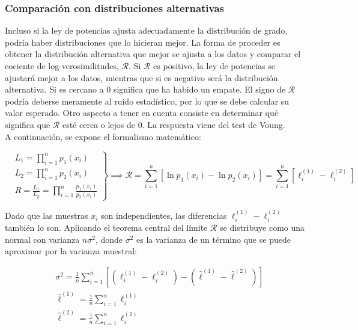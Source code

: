 \documentclass[12pt,a4paper]{report}
\begin{document}
	\subsubsection{Comparación con distribuciones alternativas}
	Incluso si la ley de potencias ajusta adecuadamente la distribución de grado, podría haber distribuciones que lo hicieran mejor. La forma de proceder es obtener la distribución alternativa que mejor se ajusta a los datos y comparar el cociente de log-verosimilitudes, $\mathcal{R}$. Si $\mathcal{R}$ es positivo, la ley de potencias se ajustará mejor a los datos, mientras que si es negativo será la distribución alternativa. Si es cercano a 0 significa que ha habido un empate. El signo de $\mathcal{R}$ podría deberse meramente al ruido estadístico, por lo que se debe calcular su valor esperado. Otro aspecto a tener en cuenta consiste en determinar qué significa que $\mathcal{R}$ esté cerca o lejos de 0. La respuesta viene del test de Voung. \\
	
	A continuación, se expone el formalismo matemático:
	
	\begin{equation}
	\left.
	\begin{aligned}
	& L_1 = \prod_{i=1}^n p_1(x_i) \\
	& L_2 = \prod_{i=1}^n p_2(x_i) \\
	& R = \frac{L_1}{L_2} = \prod_{i=1}^n \frac{p_1(x_i)}{p_2(x_i)}
	\end{aligned}
	\right\} \implies \mathcal{R} = \sum_{i=1}^n \left[\ln p_1(x_i) - \ln p_2(x_i)\right] = \sum_{i=1}^{n}\left[\ell_i^{(1)} - \ell_i^{(2)}\right]
	\end{equation}
	
	Dado que las muestras $x_i$ son independientes, las diferencias $\ell_i^{(1)} - \ell_i^{(2)}$ también lo son. Aplicando el teorema central del límite $\mathcal{R}$ se distribuye como una normal con varianza $n \sigma^2$, donde $\sigma^2$ es la varianza de un término que se puede aproximar por la varianza muestral:
	
	\begin{align}
	& \sigma^2 = \frac{1}{n}\sum_{i=1}^n\left[\left(\ell_i^{(1)} - \ell_i^{(2)}\right) - \left(\hat{\ell}^(1) - \hat{\ell}^{(2)}\right)\right] \\
	& \hat{\ell}^{(1)} = \frac{1}{n} \sum_{i=1}^n \ell_i^{(1)} \\
	& \hat{\ell}^{(2)} = \frac{1}{n} \sum_{i=1}^n \ell_i^{(2)}
	\end{align}
	
\end{document}
